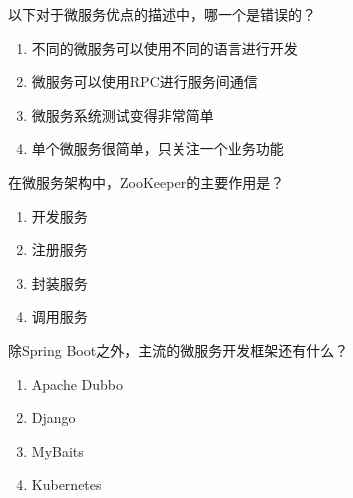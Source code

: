 \begin{problem}
	‌以下对于微服务优点的描述中，哪一个是错误的？
    \vspace{-0.8em}
    \begin{multicols}{2}
        \begin{enumerate}[label=\Alph*.]
            \item 不同的微服务可以使用不同的语言进行开发
            \item 微服务可以使用RPC进行服务间通信
            \item 微服务系统测试变得非常简单
            \item 单个微服务很简单，只关注一个业务功能
        \end{enumerate}
    \end{multicols}
    \vspace{-1em}
\end{problem}



\begin{problem}
	在微服务架构中，ZooKeeper的主要作用是？
    \vspace{-0.8em}
    \begin{multicols}{4}
        \begin{enumerate}[label=\Alph*.]
            \item 开发服务
            \item 注册服务
            \item 封装服务
            \item 调用服务
        \end{enumerate}
    \end{multicols}
    \vspace{-1em}
\end{problem}



\begin{problem}
	除Spring Boot之外，主流的微服务开发框架还有什么？
    \vspace{-0.8em}
    \begin{multicols}{4}
        \begin{enumerate}[label=\Alph*.]
            \item Apache Dubbo
            \item Django
            \item MyBaits
            \item Kubernetes
        \end{enumerate}
    \end{multicols}
    \vspace{-1em}
\end{problem}



